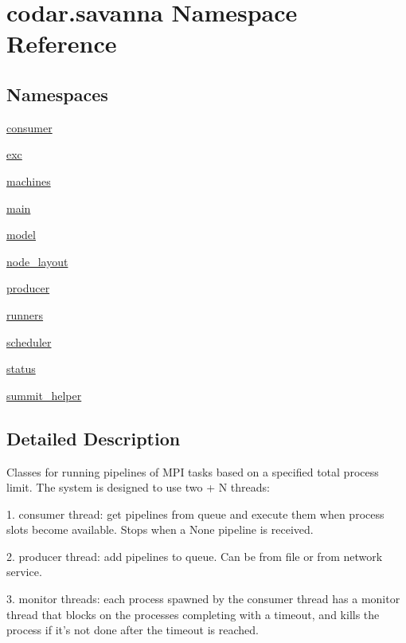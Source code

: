 \hypertarget{namespacecodar_1_1savanna}{}\section{codar.\+savanna Namespace Reference}
\label{namespacecodar_1_1savanna}
\subsection*{Namespaces}
\begin{DoxyCompactItemize}
\item 
 \hyperlink{namespacecodar_1_1savanna_1_1consumer}{consumer}
\item 
 \hyperlink{namespacecodar_1_1savanna_1_1exc}{exc}
\item 
 \hyperlink{namespacecodar_1_1savanna_1_1machines}{machines}
\item 
 \hyperlink{namespacecodar_1_1savanna_1_1main}{main}
\item 
 \hyperlink{namespacecodar_1_1savanna_1_1model}{model}
\item 
 \hyperlink{namespacecodar_1_1savanna_1_1node__layout}{node\+\_\+layout}
\item 
 \hyperlink{namespacecodar_1_1savanna_1_1producer}{producer}
\item 
 \hyperlink{namespacecodar_1_1savanna_1_1runners}{runners}
\item 
 \hyperlink{namespacecodar_1_1savanna_1_1scheduler}{scheduler}
\item 
 \hyperlink{namespacecodar_1_1savanna_1_1status}{status}
\item 
 \hyperlink{namespacecodar_1_1savanna_1_1summit__helper}{summit\+\_\+helper}
\end{DoxyCompactItemize}


\subsection{Detailed Description}
\begin{DoxyVerb}Classes for running pipelines of MPI tasks based on a specified
total process limit. The system is designed to use two + N threads:

1. consumer thread: get pipelines from queue and execute them when process
   slots become available. Stops when a None pipeline is received.

2. producer thread: add pipelines to queue. Can be from file or from network
   service.

3. monitor threads: each process spawned by the consumer thread has a monitor
   thread that blocks on the processes completing with a timeout, and kills the
   process if it's not done after the timeout is reached.
\end{DoxyVerb}
 